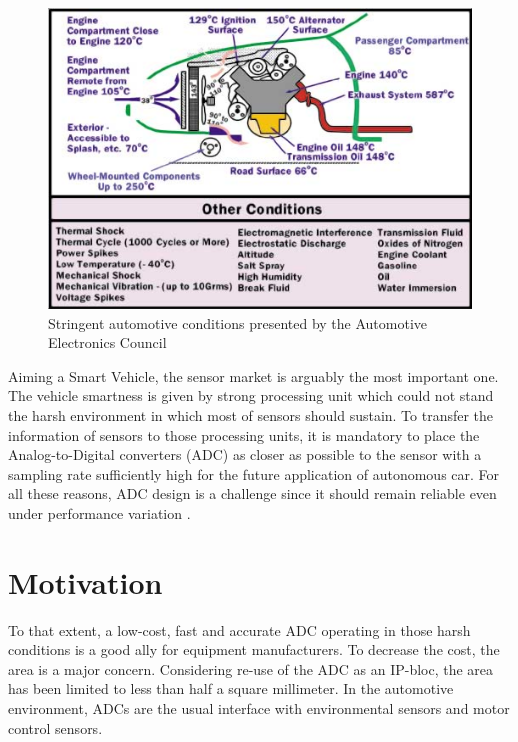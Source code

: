 \begin{figure}[htp]
	\centering
	\includegraphics[width=.8\textwidth]{Chapter1/Figs/automotive_cond.png}
	\caption{Stringent automotive conditions presented by the Automotive Electronics Council~\cite{1393072,ISO16750}}
	\label{fig:automotive-cond}
\end{figure}

Aiming a Smart Vehicle, the sensor market is arguably the most important one. The vehicle smartness is given by strong processing unit which could not stand the harsh environment in which most of sensors should sustain. To transfer the information of sensors to those processing units, it is mandatory to place the Analog-to-Digital converters (ADC) as closer as possible to the sensor with a sampling rate sufficiently high for the future application of autonomous car. For all these reasons, ADC design is a challenge since it should remain reliable even under performance variation \cite{Cai2012}.

\section{Motivation}   %
To that extent, a low-cost, fast and accurate ADC operating in those harsh conditions is a good ally for equipment manufacturers. To decrease the cost, the area is a major concern. Considering re-use of the ADC as an IP-bloc, the area has been limited to less than half a square millimeter.
In the automotive environment, ADCs are the usual interface with environmental sensors and motor control sensors. 

